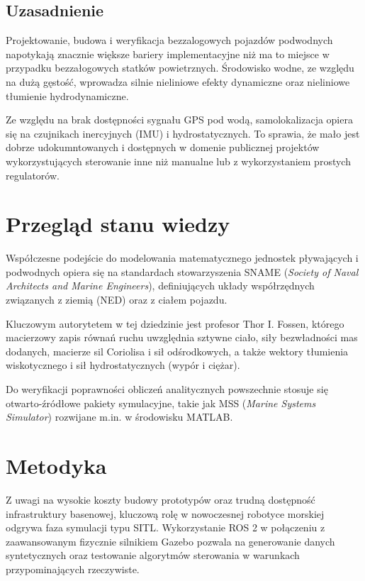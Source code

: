 \subsection{Uzasadnienie}
Projektowanie, budowa i weryfikacja bezzalogowych pojazdów podwodnych napotykają znacznie większe bariery implementacyjne niż ma to miejsce w przypadku bezzałogowych statków powietrznych. Środowisko wodne, ze względu na dużą gęstość, wprowadza silnie nieliniowe efekty dynamiczne oraz nieliniowe tłumienie hydrodynamiczne. 

Ze względu na brak dostępności sygnału GPS pod wodą, samolokalizacja opiera się na czujnikach inercyjnych (IMU) i hydrostatycznych. To sprawia, że mało jest dobrze udokumntowanych i dostępnych w domenie publicznej projektów wykorzystujących sterowanie inne niż manualne lub z wykorzystaniem prostych regulatorów.

\section{Przegląd stanu wiedzy}

Współczesne podejście do modelowania matematycznego jednostek pływających i podwodnych opiera się na standardach stowarzyszenia SNAME (\emph{Society of Naval Architects and Marine Engineers}), definiujących układy współrzędnych związanych z ziemią (NED) oraz z ciałem pojazdu. 

Kluczowym autorytetem w tej dziedzinie jest profesor Thor I. Fossen, którego macierzowy zapis równań ruchu uwzględnia sztywne ciało, siły bezwładności mas dodanych, macierze sil Coriolisa i sił odśrodkowych, a także wektory tłumienia wiskotycznego i sił hydrostatycznych (wypór i ciężar). 

Do weryfikacji poprawności obliczeń analitycznych powszechnie stosuje się otwarto-źródłowe pakiety symulacyjne, takie jak MSS (\emph{Marine Systems Simulator}) rozwijane m.in. w środowisku MATLAB.

\section{Metodyka}
Z uwagi na wysokie koszty budowy prototypów oraz trudną dostępność infrastruktury basenowej, kluczową rolę w nowoczesnej robotyce morskiej odgrywa faza symulacji typu SITL. Wykorzystanie ROS 2 w połączeniu z zaawansowanym fizycznie silnikiem Gazebo pozwala na generowanie danych syntetycznych oraz testowanie algorytmów sterowania w warunkach przypominających rzeczywiste. 

